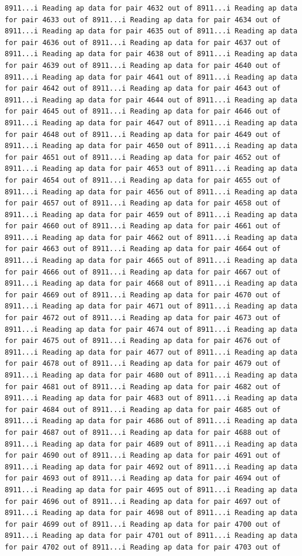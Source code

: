\documentclass[
]{article}
\begin{document}
\begin{verbatim}
8911...i Reading ap data for pair 4632 out of 8911...i Reading ap data for pair 4633 out of 8911...i Reading ap data for pair 4634 out of 8911...i Reading ap data for pair 4635 out of 8911...i Reading ap data for pair 4636 out of 8911...i Reading ap data for pair 4637 out of 8911...i Reading ap data for pair 4638 out of 8911...i Reading ap data for pair 4639 out of 8911...i Reading ap data for pair 4640 out of 8911...i Reading ap data for pair 4641 out of 8911...i Reading ap data for pair 4642 out of 8911...i Reading ap data for pair 4643 out of 8911...i Reading ap data for pair 4644 out of 8911...i Reading ap data for pair 4645 out of 8911...i Reading ap data for pair 4646 out of 8911...i Reading ap data for pair 4647 out of 8911...i Reading ap data for pair 4648 out of 8911...i Reading ap data for pair 4649 out of 8911...i Reading ap data for pair 4650 out of 8911...i Reading ap data for pair 4651 out of 8911...i Reading ap data for pair 4652 out of 8911...i Reading ap data for pair 4653 out of 8911...i Reading ap data for pair 4654 out of 8911...i Reading ap data for pair 4655 out of 8911...i Reading ap data for pair 4656 out of 8911...i Reading ap data for pair 4657 out of 8911...i Reading ap data for pair 4658 out of 8911...i Reading ap data for pair 4659 out of 8911...i Reading ap data for pair 4660 out of 8911...i Reading ap data for pair 4661 out of 8911...i Reading ap data for pair 4662 out of 8911...i Reading ap data for pair 4663 out of 8911...i Reading ap data for pair 4664 out of 8911...i Reading ap data for pair 4665 out of 8911...i Reading ap data for pair 4666 out of 8911...i Reading ap data for pair 4667 out of 8911...i Reading ap data for pair 4668 out of 8911...i Reading ap data for pair 4669 out of 8911...i Reading ap data for pair 4670 out of 8911...i Reading ap data for pair 4671 out of 8911...i Reading ap data for pair 4672 out of 8911...i Reading ap data for pair 4673 out of 8911...i Reading ap data for pair 4674 out of 8911...i Reading ap data for pair 4675 out of 8911...i Reading ap data for pair 4676 out of 8911...i Reading ap data for pair 4677 out of 8911...i Reading ap data for pair 4678 out of 8911...i Reading ap data for pair 4679 out of 8911...i Reading ap data for pair 4680 out of 8911...i Reading ap data for pair 4681 out of 8911...i Reading ap data for pair 4682 out of 8911...i Reading ap data for pair 4683 out of 8911...i Reading ap data for pair 4684 out of 8911...i Reading ap data for pair 4685 out of 8911...i Reading ap data for pair 4686 out of 8911...i Reading ap data for pair 4687 out of 8911...i Reading ap data for pair 4688 out of 8911...i Reading ap data for pair 4689 out of 8911...i Reading ap data for pair 4690 out of 8911...i Reading ap data for pair 4691 out of 8911...i Reading ap data for pair 4692 out of 8911...i Reading ap data for pair 4693 out of 8911...i Reading ap data for pair 4694 out of 8911...i Reading ap data for pair 4695 out of 8911...i Reading ap data for pair 4696 out of 8911...i Reading ap data for pair 4697 out of 8911...i Reading ap data for pair 4698 out of 8911...i Reading ap data for pair 4699 out of 8911...i Reading ap data for pair 4700 out of 8911...i Reading ap data for pair 4701 out of 8911...i Reading ap data for pair 4702 out of 8911...i Reading ap data for pair 4703 out of 
\end{verbatim}
\end{document}
